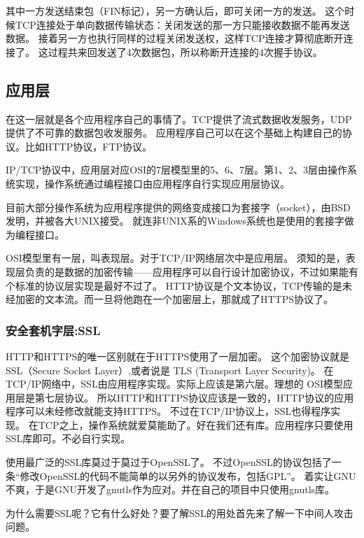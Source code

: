 其中一方发送结束包（FIN标记），另一方确认后，即可关闭一方的发送。
这个时候TCP连接处于单向数据传输状态：关闭发送的那一方只能接收数据不能再发送数据。
接着另一方也执行同样的过程关闭发送权，这样TCP连接才算彻底断开连接了。
这过程共来回发送了4次数据包，所以称断开连接的4次握手协议。

\subsection{应用层}

在这一层就是各个应用程序自己的事情了。TCP提供了流式数据收发服务，UDP提供了不可靠的数据包收发服务。
应用程序自己可以在这个基础上构建自己的协议。比如HTTP协议，FTP协议。

IP/TCP协议中，应用层对应OSI的7层模型里的5、6、7层。第1、2、3层由操作系统实现，操作系统通过编程接口由应用程序自行实现应用层协议。

目前大部分操作系统为应用程序提供的网络变成接口为套接字（socket），由BSD发明，并被各大UNIX接受。
就连非UNIX系的Windows系统也是使用的套接字做为编程接口。

OSI模型里有一层，叫表现层。对于TCP/IP网络层次中是应用层。
须知的是，表现层负责的是数据的加密传输——应用程序可以自行设计加密协议，不过如果能有个标准的协议层实现是最好不过了。
HTTP协议是个文本协议，TCP传输的是未经加密的文本流。而一旦将他跑在一个加密层上，那就成了HTTPS协议了。

\subsubsection{安全套机字层:SSL}

HTTP和HTTPS的唯一区别就在于HTTPS使用了一层加密。
这个加密协议就是SSL（Secure Socket Layer）,或者说是 TLS (Transport Layer Security)。
在TCP/IP网络中，SSL由应用程序实现。实际上应该是第六层。理想的 OSI模型应用层是第七层协议。
所以HTTP和HTTPS协议应该是一致的，HTTP协议的应用程序可以未经修改就能支持HTTPS。
不过在TCP/IP协议上，SSL也得程序实现。
在TCP之上，操作系统就爱莫能助了。好在我们还有库。应用程序只要使用 SSL库即可。不必自行实现。

使用最广泛的SSL库莫过于莫过于OpenSSL了。
不过OpenSSL的协议包括了一条“修改OpenSSL的代码不能简单的以另外的协议发布，包括GPL”。
着实让GNU不爽，于是GNU开发了gnutls作为应对。并在自己的项目中只使用gnutls库。

为什么需要SSL呢？它有什么好处？要了解SSL的用处首先来了解一下中间人攻击问题。

